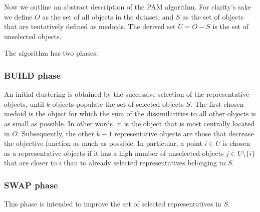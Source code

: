 Now we outline an abstract description of the PAM algorithm.\newline 
For clarity's sake we define $O$ as the set of all objects in the dataset, and $S$ as the set of objects that are tentatively defined as medoids. The derived set $U = O - S$ is the set of unselected objects.

The algorithm has two phases:

\subsubsection*{BUILD phase}
An initial clustering is obtained by the successive selection of the representative objects, until $k$ objects populate the set of selected objects $S$. The first chosen medoid is the object for which the sum of the dissimilarities to all other objects is as small as possible. In other words, it is the object that is most centrally located in $O$. Subsequently, the other $k-1$ representative objects are those that decrease the objective function as much as possible. In particular, a point $i \in U$ is chosen as a representative objects if it has a high number of unselected objects $j\in U\setminus \{i\}$ that are closer to $i$ than to already selected representatives belonging to $S$.

\subsubsection*{SWAP phase}
This phase is intended to improve the set of selected representatives in $S$.

